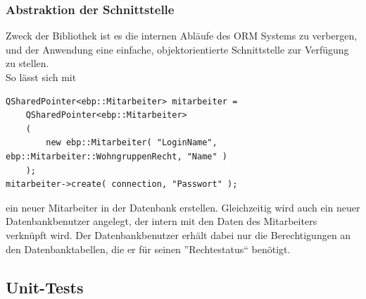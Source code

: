 \subsubsection{Abstraktion der Schnittstelle}
Zweck der Bibliothek ist es die internen Abläufe des ORM Systems zu verbergen, und der Anwendung eine einfache, objektorientierte Schnittstelle zur Verfügung zu stellen.\\
So lässt sich mit\\
\begin{lstlisting}
QSharedPointer<ebp::Mitarbeiter> mitarbeiter =
	QSharedPointer<ebp::Mitarbeiter>
	(
		new ebp::Mitarbeiter( "LoginName", ebp::Mitarbeiter::WohngruppenRecht, "Name" )
	);
mitarbeiter->create( connection, "Passwort" );
\end{lstlisting}
ein neuer Mitarbeiter in der Datenbank erstellen. Gleichzeitig wird auch ein neuer Datenbankbenutzer angelegt, der intern mit den Daten des Mitarbeiters verknüpft wird.
Der Datenbankbenutzer erhält dabei nur die Berechtigungen an den Datenbanktabellen, die er für seinen ''Rechtestatus`` benötigt.

\newpage

\subsection{Unit-Tests}
